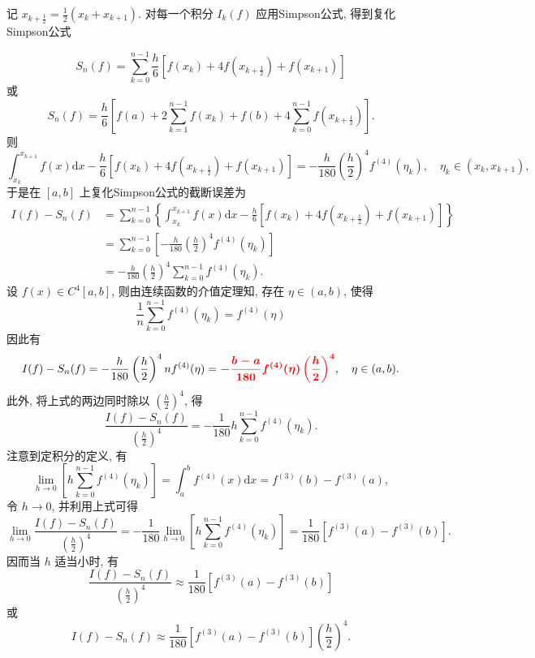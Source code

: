 记 $ x_{k+\frac{1}{2}}=\frac{1}{2}\left(x_{k}+x_{k+1}\right) $. 对每一个积分 $ I_{k}(f) $ 应用Simpson公式, 得到复化Simpson公式

$$
S_{n}(f)=\sum_{k=0}^{n-1} \frac{h}{6}\left[f\left(x_{k}\right)+4 f\left(x_{k+\frac{1}{2}}\right)+f\left(x_{k+1}\right)\right]
$$
或
$$
S_{n}(f)=\frac{h}{6}\left[f\left(a\right)+2 \sum_{k=1}^{n-1} f\left(x_{k}\right)+f\left(b\right)+4 \sum_{k=0}^{n-1} f\left(x_{k+\frac{1}{2}}\right)\right] .
$$
则
$$
 \int_{x_{k}}^{x_{k+1}} f(x) \mathrm{d} x-\frac{h}{6}\left[f\left(x_{k}\right)+4 f\left(x_{k+\frac{1}{2}}\right)+f\left(x_{k+1}\right)\right] =  -\frac{h}{180}\left(\frac{h}{2}\right)^{4} f^{(4)}\left(\eta_{k}\right), \quad \eta_{k} \in\left(x_{k}, x_{k+1}\right),
$$
于是在 $ [a, b] $ 上复化Simpson公式的截断误差为
$$
\begin{aligned}
I(f)-S_{n}(f) & =\sum_{k=0}^{n-1}\left\{\int_{x_{k}}^{x_{k+1}} f(x) \mathrm{d} x-\frac{h}{6}\left[f\left(x_{k}\right)+4 f\left(x_{k+\frac{1}{2}}\right)+f\left(x_{k+1}\right)\right]\right\} \\
& =\sum_{k=0}^{n-1}\left[-\frac{h}{180}\left(\frac{h}{2}\right)^{4} f^{(4)}\left(\eta_{k}\right)\right] \\
& =-\frac{h}{180}\left(\frac{h}{2}\right)^{4} \sum_{k=0}^{n-1} f^{(4)}\left(\eta_{k}\right) .
\end{aligned}
$$
设 $ f(x) \in C^{4}[a, b] $, 则由连续函数的介值定理知, 存在 $ \eta \in(a, b) $, 使得
$$
\frac{1}{n} \sum_{k=0}^{n-1} f^{(4)}\left(\eta_{k}\right)=f^{(4)}(\eta)
$$
因此有
$$
I(f)-S_{n}(f)  =-\frac{h}{180}\left(\frac{h}{2}\right)^{4} n f^{(4)}(\eta)  =\textcolor{red}{\bm{-\frac{b-a}{180} f^{(4)}(\eta)\left(\frac{h}{2}\right)^{4}}}, \quad \eta \in(a, b) .
$$
此外, 将上式的两边同时除以 $ \left(\frac{h}{2}\right)^{4} $, 得
$$
\frac{I(f)-S_{n}(f)}{\left(\frac{h}{2}\right)^{4}}=-\frac{1}{180} h \sum_{k=0}^{n-1} f^{(4)}\left(\eta_{k}\right) .
$$
注意到定积分的定义, 有
$$
\lim _{h \rightarrow 0}\left[h \sum_{k=0}^{n-1} f^{(4)}\left(\eta_{k}\right)\right]=\int_{a}^{b} f^{(4)}(x) \mathrm{d} x=f^{(3)}(b)-f^{(3)}(a),
$$
令 $ h \rightarrow 0 $, 并利用上式可得
$$
\lim _{h \rightarrow 0} \frac{I(f)-S_{n}(f)}{\left(\frac{h}{2}\right)^{4}}=-\frac{1}{180} \lim _{h \rightarrow 0}\left[h \sum_{k=0}^{n-1} f^{(4)}\left(\eta_{k}\right)\right]=\frac{1}{180}\left[f^{(3)}(a)-f^{(3)}(b)\right] .
$$
因而当 $ h $ 适当小时, 有
$$
\frac{I(f)-S_{n}(f)}{\left(\frac{h}{2}\right)^{4}} \approx \frac{1}{180}\left[f^{(3)}(a)-f^{(3)}(b)\right]
$$
或
$$
I(f)-S_{n}(f) \approx \frac{1}{180}\left[f^{(3)}(a)-f^{(3)}(b)\right]\left(\frac{h}{2}\right)^{4} .
$$

